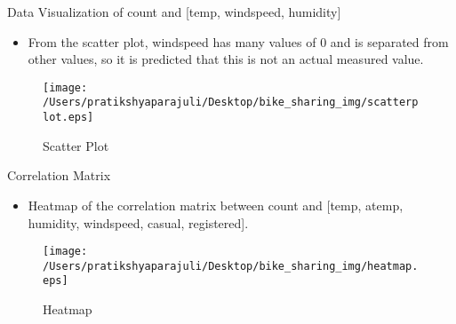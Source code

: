 \documentclass[
 size=14pt,
 paper=smartboard,  %
 mode=present, 		%
 display=slides, 	%
 style=tuliplab,  	%
 pauseslide,
 fleqn,leqno]{powerdot}
\begin{document}
      \begin{slide}[toc=,bm=]{ Data Visualization of count and [temp, windspeed, humidity]}

        \begin{itemize}
        \item From the scatter plot,  windspeed has many values of 0 and is separated from other values, so it is predicted that this is not an actual measured value.
        \end{itemize}
        \begin{figure}
          \centering
          \centerline{\texttt{[image: /Users/pratikshyaparajuli/Desktop/bike\_sharing\_img/scatterplot.eps]}}
          \caption{Scatter Plot}\label{fig:Scatter Plot}
        \end{figure}
        \end{slide}
    

  \begin{slide}[toc=,bm=]{ Correlation Matrix }
    \begin{itemize}
      \item  Heatmap of the correlation matrix between count and [temp, atemp, humidity, windspeed, casual, registered].
    \end{itemize}
    \begin{figure}
      \centering
      \centerline{\texttt{[image: /Users/pratikshyaparajuli/Desktop/bike\_sharing\_img/heatmap.eps]}}
      \caption{Heatmap}\label{fig:Heatmap}
    \end{figure}
    \end{slide}
\end{document}
